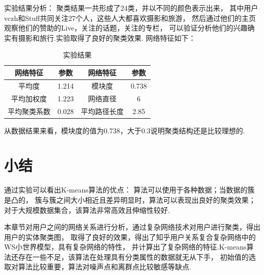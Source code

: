 \documentclass[bachelor,adobefonts]{jnuthesis}
\begin{document}
实验结果分析：
聚类结果一共形成了24类，并以不同的颜色表示出来，
其中用户vczh和Stuff共同关注27个人，这些人大都喜欢摄影和旅游，
然后通过他们的主页观察他们的赞助的Live，关注的话题，关注的专栏，
可以验证分析他们的兴趣确实有摄影和旅行.实验取得了良好的聚类效果.
网络特征如下：
\begin{table}[ht]
  \centering\begin{tabular}{cccc}
    \toprule
    \textbf{网络特征} & \textbf{参数} &   \textbf{网络特征} & \textbf{参数}\\
    \midrule
    平均度  &  1.214  &   模块度  &  0.738 \\
    平均加权度  &  1.223  & 网络直径  &  6     \\
    平均聚类系数    &  0.028 & 平均路径长度 &  2.85 \\
    \bottomrule
  \end{tabular}
  \caption{实验结果}
\end{table}

从数据结果来看，模块度的值为0.738，大于0.3说明聚类结构还是比较理想的.








\section{小结}
通过实验可以看出K-means算法的优点：
算法可以使用于各种数据；当数据的簇是凸的，
簇与簇之间大小相近且差异明显时，算法可以表现出良好的聚类效果；
对于大规模数据集合，该算法非常高效且伸缩性较好.

本章节对用户之间的网络关系进行分析，通过复杂网络技术对用户进行聚类，得出用户的实体聚类图，
取得了良好的效果，得出了知乎用户关系复合复杂网络中的WS小世界模型，具有复杂网络的特性，
并计算出了复杂网络的特征.K-means算法还存在一些不足，该算法在处理具有分类属性的数据就无从下手，
初始值的选取对算法比较重要，算法对噪声点和离群点比较敏感等缺点.
\end{document}
